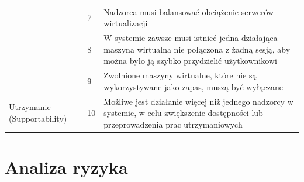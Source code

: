 \documentclass[12pt]{article}
\begin{document}
\begin{center}
\begin{table}[h!]
\begin{tabular}{|p{}|p{}|p{}|}
			                                                & 7            & Nadzorca musi balansować obciążenie serwerów wirtualizacji                                                                                                              \\ \cline{2-3}
			                                                & 8            & W systemie zawsze musi istnieć jedna działająca maszyna wirtualna nie połączona z żadną sesją, aby można było ją szybko przydzielić użytkownikowi                       \\ \cline{2-3}
			                                                & 9            & Zwolnione maszyny wirtualne, które nie są wykorzystywane jako zapas, muszą być wyłączane                                                                                \\ \hline
			\multirow[t]{3}{=}{Utrzymanie (Supportability)} & 10           & Możliwe jest działanie więcej niż jednego nadzorcy w systemie, w celu zwiększenie dostępności lub przeprowadzenia prac utrzymaniowych                                   \\
			\hline
		\end{tabular}
	\end{table}
\end{center}

\newpage

\section{Analiza ryzyka}
\end{document}
